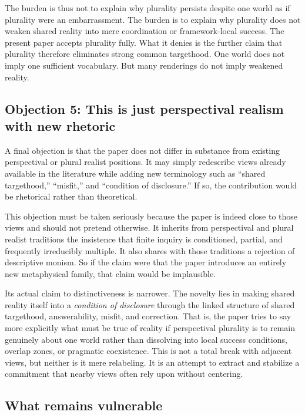 \documentclass[11pt]{article}
\renewcommand{\emph}[1]{\textit{#1}}
\begin{document}
The burden is thus not to explain why plurality persists despite one world as if plurality were an embarrassment. The burden is to explain why plurality does not weaken shared reality into mere coordination or framework-local success. The present paper accepts plurality fully. What it denies is the further claim that plurality therefore eliminates strong common targethood. One world does not imply one sufficient vocabulary. But many renderings do not imply weakened reality.

\subsection{Objection 5: This is just perspectival realism with new rhetoric}

A final objection is that the paper does not differ in substance from existing perspectival or plural realist positions. It may simply redescribe views already available in the literature while adding new terminology such as ``shared targethood,'' ``misfit,'' and ``condition of disclosure.'' If so, the contribution would be rhetorical rather than theoretical.

This objection must be taken seriously because the paper is indeed close to those views and should not pretend otherwise. It inherits from perspectival and plural realist traditions the insistence that finite inquiry is conditioned, partial, and frequently irreducibly multiple. It also shares with those traditions a rejection of descriptive monism. So if the claim were that the paper introduces an entirely new metaphysical family, that claim would be implausible.

Its actual claim to distinctiveness is narrower. The novelty lies in making shared reality itself into a \emph{condition of disclosure} through the linked structure of shared targethood, answerability, misfit, and correction. That is, the paper tries to say more explicitly what must be true of reality if perspectival plurality is to remain genuinely about one world rather than dissolving into local success conditions, overlap zones, or pragmatic coexistence. This is not a total break with adjacent views, but neither is it mere relabeling. It is an attempt to extract and stabilize a commitment that nearby views often rely upon without centering.

\subsection{What remains vulnerable}
\end{document}
